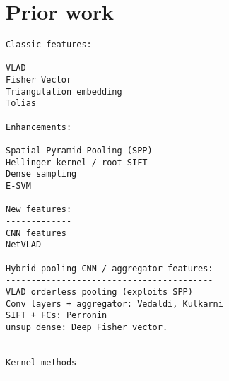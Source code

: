 \section{Prior work}
\label{prior work}

\begin{verbatim}
Classic features:
-----------------
VLAD
Fisher Vector
Triangulation embedding
Tolias

Enhancements:
-------------
Spatial Pyramid Pooling (SPP)
Hellinger kernel / root SIFT
Dense sampling
E-SVM

New features:
-------------
CNN features
NetVLAD

Hybrid pooling CNN / aggregator features:
-----------------------------------------
VLAD orderless pooling (exploits SPP)
Conv layers + aggregator: Vedaldi, Kulkarni
SIFT + FCs: Perronin
unsup dense: Deep Fisher vector.


Kernel methods
--------------
\end{verbatim}





